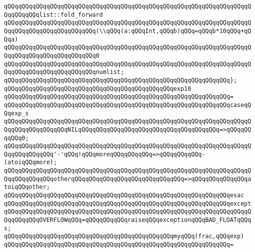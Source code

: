 \verb|qQQqqQQqqQQqqQQqqQQqqQQqqQQqqQQqqQQqqQQqqQQqqQQqqQQqqQQqqQQqqQQqqQQqqQQqqQQqqQQqlist::fold_forward|\newline
\verb|qQQqqQQqqQQqqQQqqQQqqQQqqQQqqQQqqQQqqQQqqQQqqQQqqQQqqQQqqQQqqQQqqQQqqQQqqQQqqQQqqQQqqQQqqQQqqQQq(\\qQQq(a:qQQqInt,qQQqb)qQQq=qQQqb*10qQQq+qQQqa)|\newline
\verb|qQQqqQQqqQQqqQQqqQQqqQQqqQQqqQQqqQQqqQQqqQQqqQQqqQQqqQQqqQQqqQQqqQQqqQQqqQQqqQQqqQQqqQQqqQQqqQQq0|\newline
\verb|qQQqqQQqqQQqqQQqqQQqqQQqqQQqqQQqqQQqqQQqqQQqqQQqqQQqqQQqqQQqqQQqqQQqqQQqqQQqqQQqqQQqqQQqqQQqqQQqnumlist;|\newline
\verb|qQQqqQQqqQQqqQQqqQQqqQQqqQQqqQQqqQQqqQQqqQQqqQQqqQQqqQQqqQQqqQQq};|\newline
\newline
\newline
\verb|qQQqqQQqqQQqqQQqqQQqqQQqqQQqqQQqqQQqqQQqqQQqqQQqexp10|\newline
\verb|qQQqqQQqqQQqqQQqqQQqqQQqqQQqqQQqqQQqqQQqqQQqqQQqqQQqqQQqqQQqqQQq=|\newline
\verb|qQQqqQQqqQQqqQQqqQQqqQQqqQQqqQQqqQQqqQQqqQQqqQQqqQQqqQQqqQQqqQQqcaseqQQqexp_s|\newline
\verb|qQQqqQQqqQQqqQQqqQQqqQQqqQQqqQQqqQQqqQQqqQQqqQQqqQQqqQQqqQQqqQQqqQQqqQQqqQQqqQQqqQQqqQQqNILqQQqqQQqqQQqqQQqqQQqqQQqqQQqqQQqqQQqqQQq=>qQQqqQQqqQQq0;|\newline
\verb|qQQqqQQqqQQqqQQqqQQqqQQqqQQqqQQqqQQqqQQqqQQqqQQqqQQqqQQqqQQqqQQqqQQqqQQqqQQqqQQqqQQq'-'qQQq!qQQqmoreqQQqqQQqqQQq=>qQQqqQQqqQQq-(atoiqQQqmore);|\newline
\verb|qQQqqQQqqQQqqQQqqQQqqQQqqQQqqQQqqQQqqQQqqQQqqQQqqQQqqQQqqQQqqQQqqQQqqQQqqQQqqQQqqQQqotherqQQqqQQqqQQqqQQqqQQqqQQqqQQqqQQq=>qQQqqQQqqQQqqQQqatoiqQQqother;|\newline
\verb|qQQqqQQqqQQqqQQqqQQqqQQqqQQqqQQqqQQqqQQqqQQqqQQqqQQqqQQqqQQqqQQqesac|\newline
\verb|qQQqqQQqqQQqqQQqqQQqqQQqqQQqqQQqqQQqqQQqqQQqqQQqqQQqqQQqqQQqqQQqexcept|\newline
\verb|qQQqqQQqqQQqqQQqqQQqqQQqqQQqqQQqqQQqqQQqqQQqqQQqqQQqqQQqqQQqqQQqqQQqqQQqqQQqqQQqOVERFLOWqQQq=qQQqqQQqqQQqraiseqQQqexceptionqQQqBAD_FLOATqQQqs;|\newline
\newline
\verb|qQQqqQQqqQQqqQQqqQQqqQQqqQQqqQQqqQQqqQQqqQQqqQQqmyqQQq(frac,qQQqexp)|\newline
\verb|qQQqqQQqqQQqqQQqqQQqqQQqqQQqqQQqqQQqqQQqqQQqqQQqqQQqqQQqqQQqqQQq=|\newline
